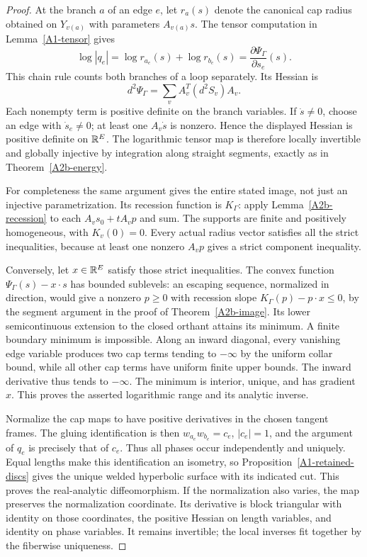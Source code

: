 \begin{proof}
At the branch $a$ of an edge $e$, let $r_a(s)$ denote the canonical
cap radius obtained on $Y_{v(a)}$ with parameters $A_{v(a)}s$.
The tensor computation in Lemma~\ref{A1-tensor} gives
\[
 \log|q_e|=\log r_{a_e}(s)+\log r_{b_e}(s)
          =\frac{\partial\Psi_\Gamma}{\partial s_e}(s).
\]
This chain rule counts both branches of a loop separately. Its Hessian
is
\[
 d^2\Psi_\Gamma=\sum_v A_v^T(d^2S_v)A_v.
\]
Each nonempty term is positive definite on the branch variables. If
$\dot s\ne0$, choose an edge with $\dot s_e\ne0$; at least one
$A_v\dot s$ is nonzero. Hence the displayed Hessian is positive
definite on ${\mathbb{R}}^E$. The logarithmic tensor map is therefore locally
invertible and globally injective by integration along straight
segments, exactly as in Theorem~\ref{A2b-energy}.

For completeness the same argument gives the entire stated image,
not just an injective parametrization. Its recession function is
$K_\Gamma$: apply Lemma~\ref{A2b-recession} to each $A_vs_0+tA_vp$
and sum. The supports are finite and positively homogeneous, with
$K_v(0)=0$. Every actual radius vector satisfies all the strict
inequalities, because at least one nonzero $A_vp$ gives a strict
component inequality.

Conversely, let $x\in{\ensuremath{\mathbb{R}}}^E$ satisfy those strict inequalities.
The convex function $\Psi_\Gamma(s)-x\cdot s$ has bounded sublevels:
an escaping sequence, normalized in direction, would give a nonzero
$p\geq0$ with recession slope $K_\Gamma(p)-p\cdot x\leq0$, by
the segment argument in the proof of Theorem~\ref{A2b-image}.
Its lower semicontinuous extension to the closed orthant attains its
minimum. A finite boundary minimum is impossible. Along an inward
diagonal, every vanishing edge variable produces two cap terms tending
to $-\infty$ by the uniform collar bound, while all other cap terms
have uniform finite upper bounds. The inward derivative thus tends
to $-\infty$. The minimum is interior, unique, and has gradient $x$.
This proves the asserted logarithmic range and its analytic inverse.

Normalize the cap maps to have positive derivatives in the chosen
tangent frames. The gluing identification is then
$w_{a_e}w_{b_e}=c_e$, $|c_e|=1$, and the argument of $q_e$ is
precisely that of $c_e$. Thus all phases occur independently and
uniquely. Equal lengths make this identification an isometry, so
Proposition~\ref{A1-retained-discs} gives the unique welded hyperbolic
surface with its indicated cut. This proves the real-analytic
diffeomorphism. If the normalization also varies, the map preserves
the normalization coordinate. Its derivative is block triangular
with identity on those coordinates, the positive Hessian on length
variables, and identity on phase variables. It remains invertible;
the local inverses fit together by the fiberwise uniqueness.


\end{proof}
